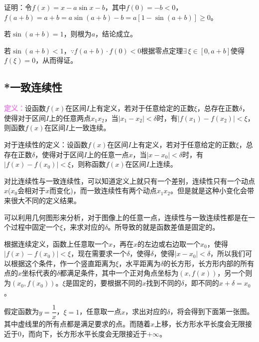 \documentclass[UTF8, 12pt]{ctexart}
\begin{document}
        证明：令$f(x)=x-a\sin x-b$，其中$f(0)=-b<0$，$f(a+b)=a+b=a\sin(a+b)-b=a[1-\sin(a+b)]\geqslant 0$。

        若$\sin(a+b)=1$，则根为$a$，结论成立。

        若$\sin(a+b)<1$，$\because f(a+b)\cdot f(0)<0$根据零点定理$\exists\,\xi\in[0,a+b]$使得$f(\xi)=0$，从而得证。

        \subsection{*一致连续性}

        \textcolor{violet}{\textbf{定义：}}设函数$f(x)$在区间$I$上有定义，若对于任意给定的正数$\xi$，总存在正数$\delta$，使得对于区间$I$上的任意两点$x_1x_2$，当$\vert x_1-x_2\vert<\delta$时，有$\vert f(x_1)-f(x_2)\vert<\xi$，则函数$f(x)$在区间$I$上一致连续。

        对于连续性的定义：设函数$f(x)$在区间$I$上有定义，若对于任意给定的正数$\xi$，总存在正数$\delta$，使得对于区间$I$上的任意一点$x$，当$\vert x-x_0\vert<\delta$时，有$\vert f(x)-f(x_0)\vert<\xi$，则称函数$f(x)$在区间$I$上连续。

        对比连续性与一致连续性，可以知道定义上就只有一个差别，连续性只有一个动点$x$($x_0$会相对于$x$而变化)，而一致连续性有两个动点$x_1x_2$。但是就是这种小变化会带来很大不同的定义结果。

        可以利用几何图形来分析，对于图像上的任意一点，连续性与一致连续性都是在一个过程中固定一个$\xi$，来求对应的$\delta$。所导致的就是函数差值是固定的。

        根据连续定义，函数上任意取一个$x$，再在$x$的左边或右边取一个$x_0$，使得$\vert f(x)-f(x_0)\vert<\xi$，现在需要求一个$\delta$，使得$\delta$，使得$\vert x-x_0\vert<\delta$，所以我们可以根据这个条件，作一个竖直距离为$\xi$，水平距离为$\delta$的长方形，长方形内部的所有点的$x$坐标代表的$\delta$都满足条件，其中一个正对角点坐标为$(x,f(x))$，另一个则为$(x_0,f(x_0))$。$\xi$是固定的，要根据不同的$x$找到不同的$\delta$，即不同的$x+\delta=x_0$。

        假定函数为$y=\dfrac{1}{x}$，$\xi=1$，任意取一点$x$，求出对应的$\delta$，将会得到下面第一张图。其中虚线里的所有点都是满足要求的点。而随着$x$上移，长方形水平长度会无限接近于0，而向下，长方形水平长度会无限接近于$+\infty$。
\end{document}
